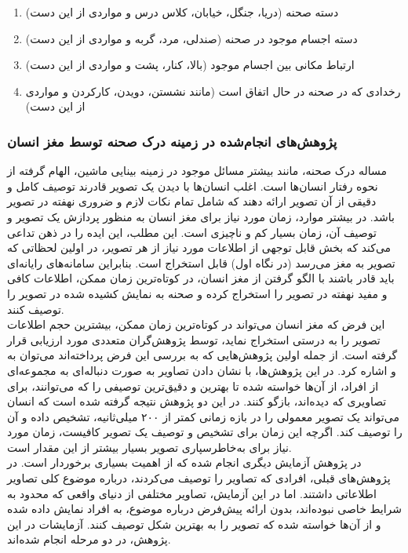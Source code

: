 \begin{enumerate}
\item دسته‌ صحنه (دریا، جنگل، خیابان، کلاس درس و مواردی از این دست)
\item دسته‌ اجسام موجود در صحنه (صندلی، مرد، گربه و مواردی از این دست)
\item ارتباط مکانی بین اجسام موجود (بالا، کنار، پشت و مواردی از این دست)
\item رخدادی که در صحنه در حال اتفاق است (مانند نشستن، دویدن، کارکردن و مواردی از این دست)
\end{enumerate}

\subsubsection{پژوهش‌های انجام‌شده در زمینه درک صحنه توسط مغز انسان}
مساله درک صحنه، مانند بیشتر مسائل موجود در زمینه بینایی ماشین، الهام گرفته از نحوه رفتار انسان‌ها است. اغلب انسان‌ها با دیدن یک تصویر قادرند توصیف کامل و دقیقی از آن تصویر ارائه دهند که شامل تمام نکات لازم و ضروری نهفته در تصویر باشد. در بیشتر موارد، زمان مورد نیاز برای مغز انسان به منظور پردازش یک تصویر و توصیف آن، زمان بسیار کم و ناچیزی است. این مطلب، این ایده را در ذهن تداعی می‌کند که بخش قابل توجهی از اطلاعات مورد نیاز از هر تصویر، در اولین لحظاتی که تصویر به مغز می‌رسد (در نگاه اول) قابل استخراج است. بنابراین سامانه‌های رایانه‌ای باید قادر باشند با الگو گرفتن از مغز انسان، در کوتاه‌ترین زمان ممکن، اطلاعات کافی و مفید نهفته در تصویر را استخراج کرده و صحنه به نمایش کشیده شده در تصویر را توصیف کنند.
\\
این فرض که مغز انسان می‌تواند در کوتاه‌ترین زمان ممکن، بیشترین حجم اطلاعات تصویر را به درستی استخراج نماید، توسط پژوهش‌گران متعددی مورد ارزیابی قرار گرفته است. از جمله اولین پژوهش‌هایی که به بررسی این فرض پرداخته‌اند می‌توان به 
\cite{potter1976short}
و
\cite{potter2002recognition}
اشاره کرد. در این‌ پژوهش‌ها، با نشان دادن تصاویر به صورت دنباله‌ای به مجموعه‌ای از افراد، از آن‌ها خواسته شده تا بهترین و دقیق‌ترین توصیفی را که می‌توانند، برای تصاویری که دیده‌اند، بازگو کنند. در این دو پژوهش نتیجه گرفته شده است که انسان می‌تواند یک تصویر معمولی را در بازه زمانی کمتر از ۲۰۰ میلی‌ثانیه، تشخیص داده و آن را توصیف کند. اگرچه این زمان برای تشخیص و توصیف یک تصویر کافیست، زمان مورد نیاز برای به‌خاطرسپاری تصویر بسیار بیشتر از این مقدار است.
\\
در پژوهش\cite{fei2007we}
آزمایش دیگری انجام شده که از اهمیت بسیاری برخوردار است. در پژوهش‌های قبلی، افرادی که تصاویر را توصیف می‌کردند، درباره موضوع کلی تصاویر اطلاعاتی داشتند. اما در این آزمایش، تصاویر مختلفی از دنیای واقعی که محدود به شرایط خاصی نبوده‌اند، بدون ارائه پیش‌فرض درباره موضوع، به افراد نمایش داده شده و از آن‌ها خواسته شده که تصویر را به بهترین شکل توصیف کنند. آزمایشات در این پژوهش، در دو مرحله انجام شده‌اند.
